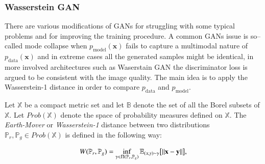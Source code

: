 \documentclass{webofc}
\newcommand{\vx}{\ensuremath{\mathbf{x}}}
\newcommand{\vz}{\ensuremath{\mathbf{z}}}
\newcommand{\pdata}{\ensuremath{p_{\text{data}}}}
\begin{document}


\subsubsection{Wasserstein GAN}
There are various modifications of GANs for struggling with some typical problems and for improving the training procedure. A common GANs issue is so--called mode collapse when $p_\text{model} (\vx)$ fails to capture a multimodal nature of $\pdata(\vx)$ and in extreme cases all the generated samples might be identical, in more involved architectures such as Waserstain GAN \cite{arjovsky2017wasserstein} the discriminator loss is argued to be consistent with the image quality. The main idea is to apply the Wasserstein-1 distance in order to compare $\pdata$ and $p_{\text{model}}$.

Let $\mathbb{X}$ be a compact metric set and let $\mathbb{B}$ denote the set of all the Borel subsets of $\mathbb{X}$. Let $Prob(\mathbb{X})$ denote the space of probability measures defined on $\mathbb{X}$. The \emph{Earth-Mover} or \emph{Wasserstein-1} distance between two distributions $\mathbb{P}_r, \mathbb{P}_g \in Prob(\mathbb{X})$ is defined in the following way:

\begin{equation}\label{wasserstein_metric}
W(\mathbb{P}_r, \mathbb{P}_g) = \inf_{\gamma \in \Pi(\mathbb{P}_r, \mathbb{P}_g)} \mathbb{E}_{(x, y) \sim \gamma} \big{[}\|\vx-\textbf{y}\|\big{]},
\end{equation}
\end{document}
